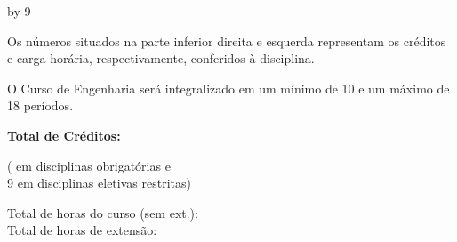 \documentclass[a4paper, landscape]{article}
\newcounter{cred}
\newcounter{thoras}
\begin{document}
\setcounter{haula}{\the\value{thoras}}
\setcounter{hextensao}{\the\value{thoras}}
\divide\value{hextensao} by 9
\addtocounter{thoras}{\the\value{hextensao}}

\vspace{-4mm}
\setlength\parindent{0pt}

\begin{multicols}{4}
  \vfill
  Os números situados na parte inferior direita e esquerda representam os créditos e carga horária, respectivamente, conferidos à disciplina.

  
  \columnbreak
  O Curso de Engenharia será integralizado em um mínimo de 10 e um máximo de 18 períodos.

  \columnbreak
  \textbf{Total de Créditos:} \the\value{cred}\\
  \addtocounter{cred}{-9}
  (\the\value{cred} em disciplinas obrigatórias e\\ 9 em disciplinas eletivas restritas)

  \columnbreak
  Total de horas do curso (sem ext.): \the\value{haula}\\
  Total de horas de extensão: \the\value{hextensao}

  
\end{multicols}
\end{document}
